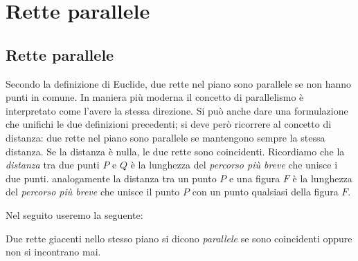 
\chapter{Rette parallele}
\label{chap:rette_parallele}


\section{Rette parallele}\label{sect:rette_parallele}

Secondo la definizione di Euclide, due rette nel piano sono parallele 
se non hanno punti in comune.
In maniera più moderna il concetto di parallelismo è interpretato 
come l'avere la stessa direzione.
Si può anche dare una formulazione che unifichi le due definizioni 
precedenti; si deve però ricorrere al concetto di distanza: due rette 
nel piano sono parallele se mantengono sempre la stessa distanza. Se 
la distanza è nulla, le due rette sono coincidenti.
Ricordiamo che la \emph{distanza} tra due punti \(P\) e \(Q\) è 
la lunghezza del \emph{percorso più breve} che unisce i due punti. 
analogamente la distanza tra un punto \(P\) e una figura \(F\) è 
la lunghezza del \emph{percorso più breve} che unisce il punto \(P\) 
con un punto qualsiasi della figura \(F\).

Nel seguito useremo la seguente:
\begin{definizione}
  Due rette giacenti nello stesso piano si dicono \emph{parallele} se 
  sono coincidenti oppure non si incontrano mai.
\end{definizione}


